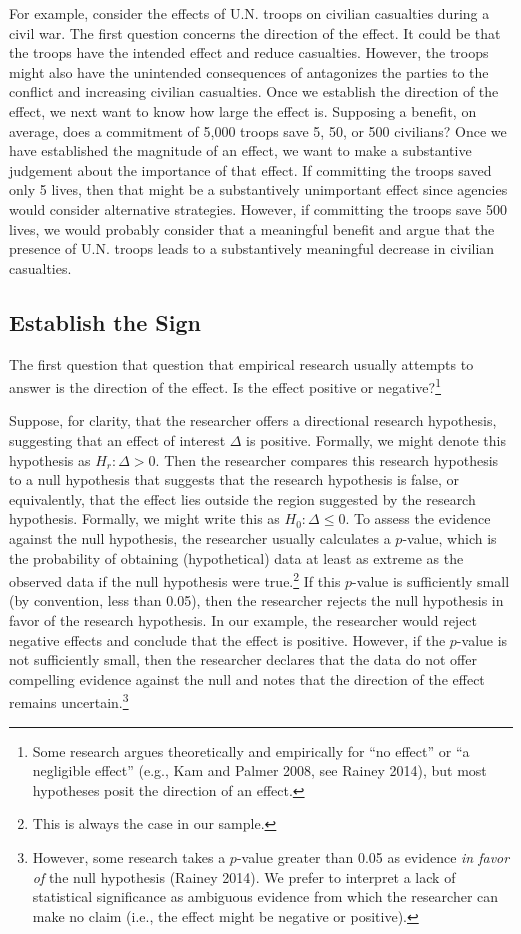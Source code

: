 \documentclass[12pt]{article}
\begin{document}
For example, consider the effects of U.N. troops on civilian casualties during a civil war. The first question concerns the direction of the effect. It could be that the troops have the intended effect and reduce casualties. However, the troops might also have the unintended consequences of antagonizes the parties to the conflict and increasing civilian casualties. Once we establish the direction of the effect, we next want to know how large the effect is. Supposing a benefit, on average, does a commitment of 5,000 troops save 5, 50, or 500 civilians? Once we have established the magnitude of an effect, we want to make a substantive judgement about the importance of that effect. If committing the troops saved only 5 lives, then that might be a substantively unimportant effect since agencies would consider alternative strategies. However, if committing the troops save 500 lives, we would probably consider that a meaningful benefit and argue that the presence of U.N. troops leads to a substantively meaningful decrease in civilian casualties.

\subsection*{Establish the Sign}

The first question that question that empirical research usually attempts to answer is the direction of the effect. Is the effect positive or negative?\footnote{Some research argues theoretically and empirically for ``no effect'' or ``a negligible effect'' (e.g., Kam and Palmer 2008, see Rainey 2014), but most hypotheses posit the direction of an effect.} 

Suppose, for clarity, that the researcher offers a directional research hypothesis, suggesting that an effect of interest $\Delta$ is positive. Formally, we might denote this hypothesis as $H_r: \Delta > 0$. Then the researcher compares this research hypothesis to a null hypothesis that suggests that the research hypothesis is false, or equivalently, that the effect lies outside the region suggested by the research hypothesis. Formally, we might write this as $H_0: \Delta \leq 0$. To assess the evidence against the null hypothesis, the researcher usually calculates a $p$-value, which is the probability of obtaining (hypothetical) data at least as extreme as the observed data if the null hypothesis were true.\footnote{This is always the case in our sample.} If this $p$-value is sufficiently small (by convention, less than 0.05), then the researcher rejects the null hypothesis in favor of the research hypothesis. In our example, the researcher would reject negative effects and conclude that the effect is positive. However, if the $p$-value is not sufficiently small, then the researcher declares that the data do not offer compelling evidence against the null and notes that the direction of the effect remains uncertain.\footnote{However, some research takes a $p$-value greater than 0.05 as evidence \textit{in favor of} the null hypothesis (Rainey 2014). We prefer to interpret a lack of statistical significance as ambiguous evidence from which the researcher can make no claim (i.e., the effect might be negative or positive).}
\end{document}

